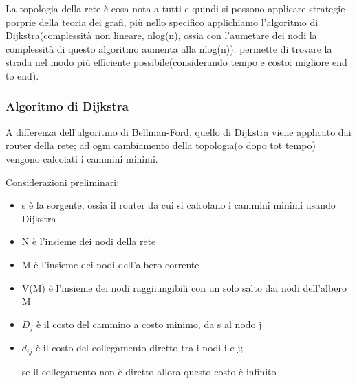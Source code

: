 La topologia della rete è cosa nota a tutti e quindi si possono applicare strategie porprie della teoria dei grafi, più nello specifico applichiamo l'algoritmo di Dijkstra(complessità non lineare, nlog(n), ossia con l'aumetare dei nodi la complessità di questo algoritmo aumenta alla nlog(n)):
permette di trovare la strada nel modo più efficiente possibile(considerando tempo e costo: migliore end to end).


\subsubsection{Algoritmo di Dijkstra}


A differenza dell'algoritmo di Bellman-Ford, quello di Dijkstra viene applicato dai router della rete; ad ogni cambiamento della topologia(o dopo tot tempo) vengono calcolati i cammini minimi.

Considerazioni preliminari:

\begin{itemize}
    \item s è la sorgente, ossia il router da cui si calcolano i cammini minimi usando Dijkstra
    \item N è l'insieme dei nodi della rete
    \item M è l'insieme dei nodi dell'albero corrente
    \item V(M) è l'insieme dei nodi raggiiungibili con un solo salto dai nodi dell'albero M
    \item $D_j$ è il costo del cammino a costo minimo, da s al nodo j
    \item $d_{ij}$ è il costo del collegamento diretto tra i nodi i e j;
    
    se il collegamento non è diretto allora questo costo è infinito
\end{itemize}

